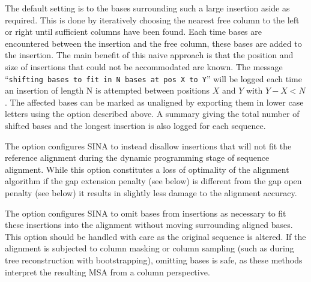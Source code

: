 \documentclass[english,a4paper]{article}
\begin{document}
\begin{Description}
The default setting is to  the
bases surrounding such a large insertion aside as required. This is done by iteratively choosing the
nearest free column to the left or right until sufficient columns have been found. Each time bases
are encountered between the insertion and the free column, these bases are added to the insertion. The
main benefit of this naive approach is that the position and size of insertions that could not be
accommodated are known. The message ``\texttt{shifting bases to fit in N bases at pos X to Y}'' will be logged
each time an insertion of length N is attempted between positions $X$ and $Y$ with $Y-X<N$. The affected
bases can be marked as unaligned by exporting them in lower case letters using the 
option described above. A summary giving the total number of shifted bases and the longest insertion
is also logged for each sequence.

The option  configures SINA to instead disallow insertions that will not fit the reference
alignment during the dynamic programming stage of sequence alignment. While this option constitutes
a loss of optimality of the alignment algorithm if the gap extension penalty (see 
below) is different from the gap open penalty (see  below) it results in slightly less
damage to the alignment accuracy. 

The option  configures SINA to omit bases from insertions as necessary to fit these
insertions into the alignment without moving surrounding aligned bases. This option should be handled
with care as the original sequence is altered. If the alignment is subjected to column masking or
column sampling (such as during tree reconstruction with bootstrapping), omitting bases is safe, as
these methods interpret the resulting MSA from a column perspective.


\end{Description}
\end{document}
